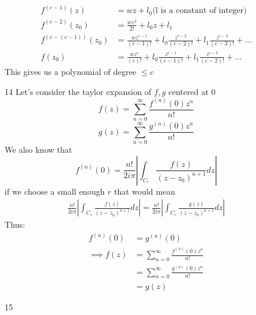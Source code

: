 \documentclass{article}
\begin{document}
\begin{enumerate}
      \begin{align*}
        f^{(c-1)}(z)&=wz+l_0\text{(l is a constant of integer)}\\
        f^{(c-2)}(z_0)&=\frac{wz^2}{2!}+l_0z+l_1\\
        f^{(c-(c-1))}(z_0)&=\frac{wz^{c-1}}{(c-1)!}+l_0\frac{z^{c-2}}{(c-2)!}+l_1\frac{z^{c-3}}{(c-3)!}+...\\
        f(z_0)&=\frac{wz^{c}}{(c)!}+l_0\frac{z^{c-1}}{(c-1)!}+l_1\frac{z^{c-2}}{(c-2)!}+...
      \end{align*}
      This gives us a polynomial of degree $\leq c$
    \item[14]
      Let's consider the taylor expansion of $f,g$ centered at 0
      \[
        f(z)=\sum_{n=0}^\infty\frac{f^{(n)}(0)z^n}{n!}
      \]\[
        g(z)=\sum_{n=0}^\infty\frac{g^{(n)}(0)z^n}{n!}
      \]
      We also know that
      \[f^{(n)}(0)=\frac{n!}{2i\pi}\left|\int_{C_r}\frac{f(z)}{(z-z_0)^{n+1}}dz\right|\]
      if we choose a small enough $r$ that would mean
      \begin{align*}
        \frac{n!}{2i\pi}\left|\int_{C_r}\frac{f(z)}{(z-z_0)^{n+1}}dz\right|=\frac{n!}{2i\pi}\left|\int_{C_r}\frac{g(z)}{(z-z_0)^{n+1}}dz\right|
      \end{align*}
      Thus:
      \begin{align*}
        f^{(n)}(0)&=g^{(n)}(0)\\
        \implies f(z)&=\sum_{n=0}^\infty\frac{f^{(n)}(0)z^n}{n!}\\
        &=\sum_{n=0}^\infty\frac{g^{(n)}(0)z^n}{n!}\\
        &=g(z)
      \end{align*}
    \item[15]

  \end{enumerate}
\end{document}
